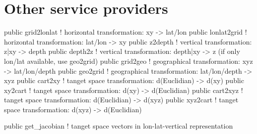 \section{Other service providers}









public grid2lonlat  ! horizontal transformation:   xy            -> lat/lon
public lonlat2grid  ! horizontal transformation:   lat/lon       -> xy
public z2depth      ! vertical transformation:     z|xy          -> depth
public depth2z      ! vertical transformation:     depth|xy      -> z   (if only lon/lat available, use geo2grid)
public grid2geo     ! geographical transformation: xyz           -> lat/lon/depth
public geo2grid     ! geographical transformation: lat/lon/depth -> xyz 
public cart2xy      ! tanget space transformation: d(Euclidian)  -> d(xy)
public xy2cart      ! tanget space transformation: d(xy)         -> d(Euclidian)
public cart2xyz     ! tanget space transformation: d(Euclidian)  -> d(xyz)
public xyz2cart     ! tanget space transformation: d(xyz)        -> d(Euclidian)

public get_jacobian ! tanget space vectors in lon-lat-vertical representation 




